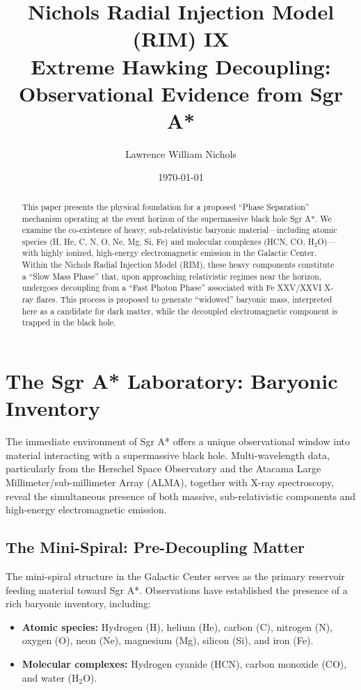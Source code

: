 \documentclass[12pt]{article}
\title {Nichols Radial Injection Model (RIM) IX\\
\newline
{Extreme Hawking Decoupling: Observational Evidence from Sgr A*}}
\author{Lawrence William Nichols}
\date{\today}
\begin{document}
\maketitle
\begin{abstract}
This paper presents the physical foundation for a proposed ``Phase Separation'' mechanism operating at the event horizon of the supermassive black hole Sgr A*. We examine the co-existence of heavy, sub-relativistic baryonic material---including atomic species (H, He, C, N, O, Ne, Mg, Si, Fe) and molecular complexes (HCN, CO, H$_2$O)---with highly ionized, high-energy electromagnetic emission in the Galactic Center. Within the Nichols Radial Injection Model (RIM), these heavy components constitute a ``Slow Mass Phase'' that, upon approaching relativistic regimes near the horizon, undergoes  decoupling from a ``Fast Photon Phase'' associated with Fe XXV/XXVI X-ray flares. This process is proposed to generate ``widowed'' baryonic mass, interpreted here as a candidate for dark matter, while the decoupled electromagnetic component is trapped in the black hole.
\end{abstract}

\section{The Sgr A* Laboratory: Baryonic Inventory}

The immediate environment of Sgr A* offers a unique observational window into material interacting with a supermassive black hole. Multi-wavelength data, particularly from the Herschel Space Observatory and the Atacama Large Millimeter/sub-millimeter Array (ALMA), together with X-ray spectroscopy, reveal the simultaneous presence of both massive, sub-relativistic components and high-energy electromagnetic emission.

\subsection{The Mini-Spiral: Pre-Decoupling Matter}

The mini-spiral structure in the Galactic Center serves as the primary reservoir feeding material toward Sgr A*. Observations have established the presence of a rich baryonic inventory, including:

\begin{itemize}
    \item \textbf{Atomic species:} Hydrogen (H), helium (He), carbon (C), nitrogen (N), oxygen (O), neon (Ne), magnesium (Mg), silicon (Si), and iron (Fe).
    \item \textbf{Molecular complexes:} Hydrogen cyanide (HCN), carbon monoxide (CO), and water (H$_2$O).
\end{itemize}
\end{document}
